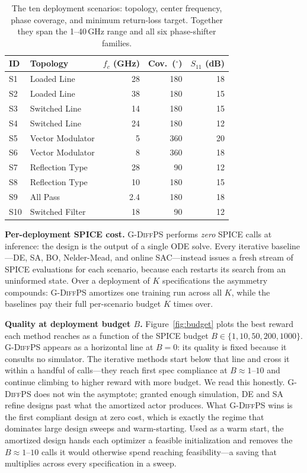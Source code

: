 \documentclass[sigconf,anonymous,review]{acmart}
\newcommand{\gdiffps}{\textsc{G-DiffPS}}
\begin{document}
\begin{table}[t]
  \caption{The ten deployment scenarios: topology, center frequency, phase
           coverage, and minimum return-loss target.  Together they span the
           1--40\,GHz range and all six phase-shifter families.}
  \label{tab:scenarios}
  \centering\small
  \begin{tabular}{llrrr}
    \toprule
    ID & Topology & $f_c$ (GHz) & Cov.\ ($^\circ$) & $S_{11}$ (dB) \\
    \midrule
    S1  & Loaded Line      & 28 & 180 & 18 \\
    S2  & Loaded Line      & 38 & 180 & 15 \\
    S3  & Switched Line    & 14 & 180 & 15 \\
    S4  & Switched Line    & 24 & 180 & 12 \\
    S5  & Vector Modulator &  5 & 360 & 20 \\
    S6  & Vector Modulator &  8 & 360 & 18 \\
    S7  & Reflection Type  & 28 &  90 & 12 \\
    S8  & Reflection Type  & 10 & 180 & 15 \\
    S9  & All Pass         & 2.4& 180 & 18 \\
    S10 & Switched Filter  & 18 &  90 & 12 \\
    \bottomrule
  \end{tabular}
\end{table}

\textbf{Per-deployment SPICE cost.}  \gdiffps{} performs \emph{zero} SPICE
calls at inference: the design is the output of a single ODE solve.  Every
iterative baseline---DE, SA, BO, Nelder-Mead, and online SAC---instead issues
a fresh stream of SPICE evaluations for each scenario, because each restarts
its search from an uninformed state.  Over a deployment of $K$ specifications
the asymmetry compounds: \gdiffps{} amortizes one training run across all $K$,
while the baselines pay their full per-scenario budget $K$ times over.

\textbf{Quality at deployment budget $B$.}  Figure~\ref{fig:budget} plots the
best reward each method reaches as a function of the SPICE budget
$B\in\{1,10,50,200,1000\}$.  \gdiffps{} appears as a horizontal line at $B=0$:
its quality is fixed because it consults no simulator.  The iterative methods
start below that line and cross it within a handful of calls---they reach first
spec compliance at $B\approx1$--$10$ and continue climbing to higher reward
with more budget.  We read this honestly.  \gdiffps{} does not win the
asymptote; granted enough simulation, DE and SA refine designs past what the
amortized actor produces.  What \gdiffps{} wins is the first compliant design
at zero cost, which is exactly the regime that dominates large design sweeps
and warm-starting.  Used as a warm start, the amortized design hands each
optimizer a feasible initialization and removes the $B\approx1$--$10$ calls it
would otherwise spend reaching feasibility---a saving that multiplies across
every specification in a sweep.
\end{document}
